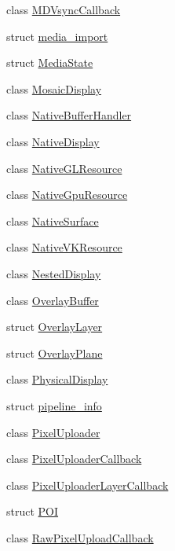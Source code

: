 \begin{DoxyCompactItemize}
\item 
class \mbox{\hyperlink{classhwcomposer_1_1MDVsyncCallback}{M\+D\+Vsync\+Callback}}
\item 
struct \mbox{\hyperlink{structhwcomposer_1_1media__import}{media\+\_\+import}}
\item 
struct \mbox{\hyperlink{structhwcomposer_1_1MediaState}{Media\+State}}
\item 
class \mbox{\hyperlink{classhwcomposer_1_1MosaicDisplay}{Mosaic\+Display}}
\item 
class \mbox{\hyperlink{classhwcomposer_1_1NativeBufferHandler}{Native\+Buffer\+Handler}}
\item 
class \mbox{\hyperlink{classhwcomposer_1_1NativeDisplay}{Native\+Display}}
\item 
class \mbox{\hyperlink{classhwcomposer_1_1NativeGLResource}{Native\+G\+L\+Resource}}
\item 
class \mbox{\hyperlink{classhwcomposer_1_1NativeGpuResource}{Native\+Gpu\+Resource}}
\item 
class \mbox{\hyperlink{classhwcomposer_1_1NativeSurface}{Native\+Surface}}
\item 
class \mbox{\hyperlink{classhwcomposer_1_1NativeVKResource}{Native\+V\+K\+Resource}}
\item 
class \mbox{\hyperlink{classhwcomposer_1_1NestedDisplay}{Nested\+Display}}
\item 
class \mbox{\hyperlink{classhwcomposer_1_1OverlayBuffer}{Overlay\+Buffer}}
\item 
struct \mbox{\hyperlink{structhwcomposer_1_1OverlayLayer}{Overlay\+Layer}}
\item 
struct \mbox{\hyperlink{structhwcomposer_1_1OverlayPlane}{Overlay\+Plane}}
\item 
class \mbox{\hyperlink{classhwcomposer_1_1PhysicalDisplay}{Physical\+Display}}
\item 
struct \mbox{\hyperlink{structhwcomposer_1_1pipeline__info}{pipeline\+\_\+info}}
\item 
class \mbox{\hyperlink{classhwcomposer_1_1PixelUploader}{Pixel\+Uploader}}
\item 
class \mbox{\hyperlink{classhwcomposer_1_1PixelUploaderCallback}{Pixel\+Uploader\+Callback}}
\item 
class \mbox{\hyperlink{classhwcomposer_1_1PixelUploaderLayerCallback}{Pixel\+Uploader\+Layer\+Callback}}
\item 
struct \mbox{\hyperlink{structhwcomposer_1_1POI}{P\+OI}}
\item 
class \mbox{\hyperlink{classhwcomposer_1_1RawPixelUploadCallback}{Raw\+Pixel\+Upload\+Callback}}

\end{DoxyCompactItemize}

